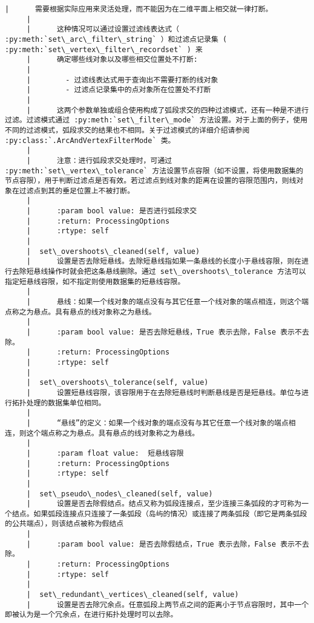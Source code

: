 \documentclass[11pt]{article}
\begin{document}
\begin{Verbatim}[commandchars=\\\{\}]
     |      需要根据实际应用来灵活处理，而不能因为在二维平面上相交就一律打断。
     |      
     |      这种情况可以通过设置过滤线表达式（ :py:meth:`set\_arc\_filter\_string` ）和过滤点记录集 ( :py:meth:`set\_vertex\_filter\_recordset` ) 来
     |      确定哪些线对象以及哪些相交位置处不打断:
     |      
     |        - 过滤线表达式用于查询出不需要打断的线对象
     |        - 过滤点记录集中的点对象所在位置处不打断
     |      
     |      这两个参数单独或组合使用构成了弧段求交的四种过滤模式，还有一种是不进行过滤。过滤模式通过 :py:meth:`set\_filter\_mode` 方法设置。对于上面的例子，使用不同的过滤模式，弧段求交的结果也不相同。关于过滤模式的详细介绍请参阅 :py:class:`.ArcAndVertexFilterMode` 类。
     |      
     |      注意：进行弧段求交处理时，可通过 :py:meth:`set\_vertex\_tolerance` 方法设置节点容限（如不设置，将使用数据集的节点容限），用于判断过滤点是否有效。若过滤点到线对象的距离在设置的容限范围内，则线对象在过滤点到其的垂足位置上不被打断。
     |      
     |      :param bool value: 是否进行弧段求交
     |      :return: ProcessingOptions
     |      :rtype: self
     |  
     |  set\_overshoots\_cleaned(self, value)
     |      设置是否去除短悬线。去除短悬线指如果一条悬线的长度小于悬线容限，则在进行去除短悬线操作时就会把这条悬线删除。通过 set\_overshoots\_tolerance 方法可以指定短悬线容限，如不指定则使用数据集的短悬线容限。
     |      
     |      悬线：如果一个线对象的端点没有与其它任意一个线对象的端点相连，则这个端点称之为悬点。具有悬点的线对象称之为悬线。
     |      
     |      :param bool value: 是否去除短悬线，True 表示去除，False 表示不去除。
     |      :return: ProcessingOptions
     |      :rtype: self
     |  
     |  set\_overshoots\_tolerance(self, value)
     |      设置短悬线容限，该容限用于在去除短悬线时判断悬线是否是短悬线。单位与进行拓扑处理的数据集单位相同。
     |      
     |      “悬线”的定义：如果一个线对象的端点没有与其它任意一个线对象的端点相连，则这个端点称之为悬点。具有悬点的线对象称之为悬线。
     |      
     |      :param float value:  短悬线容限
     |      :return: ProcessingOptions
     |      :rtype: self
     |  
     |  set\_pseudo\_nodes\_cleaned(self, value)
     |      设置是否去除假结点。结点又称为弧段连接点，至少连接三条弧段的才可称为一个结点。如果弧段连接点只连接了一条弧段（岛屿的情况）或连接了两条弧段（即它是两条弧段的公共端点），则该结点被称为假结点
     |      
     |      :param bool value: 是否去除假结点，True 表示去除，False 表示不去除。
     |      :return: ProcessingOptions
     |      :rtype: self
     |  
     |  set\_redundant\_vertices\_cleaned(self, value)
     |      设置是否去除冗余点。任意弧段上两节点之间的距离小于节点容限时，其中一个即被认为是一个冗余点，在进行拓扑处理时可以去除。

\end{Verbatim}
\end{document}

